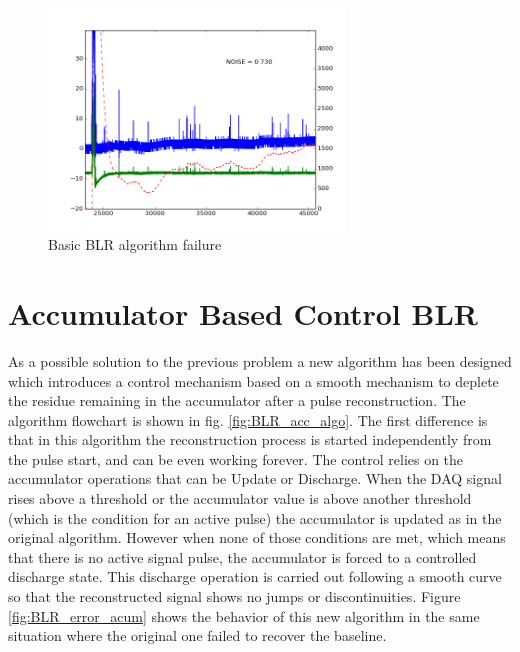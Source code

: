 \documentclass[a4paper,11pt]{report}
\begin{document}
\begin{figure}
  \begin{center}
    \includegraphics[width=0.7\textwidth]{./figures/BLR_error1.png}
    \caption{Basic BLR algorithm failure}
    \label{fig:BLR_error}
  \end{center}
\end{figure}


\section{Accumulator Based Control BLR}
\par As a possible solution to the previous problem a new algorithm has been designed which introduces a control mechanism based on a smooth mechanism to deplete the residue remaining in the accumulator after a pulse reconstruction. The algorithm flowchart is shown in fig. \ref{fig:BLR_acc_algo}. The first difference is that in this algorithm the reconstruction process is started independently from the pulse start, and can be even working forever. The control relies on the accumulator operations that can be Update or Discharge. When the DAQ signal rises above a  threshold or the accumulator value is above another threshold (which is the condition for an active pulse) the accumulator is updated as in the original algorithm. However when none of those conditions are met, which means that there is no active signal pulse, the accumulator is forced to a controlled discharge state. This discharge operation is carried out following a smooth curve so that the reconstructed signal shows no jumps or discontinuities. Figure \ref{fig:BLR_error_acum} shows the behavior of this new algorithm in the same situation where the original one failed to recover the baseline.
\end{document}
